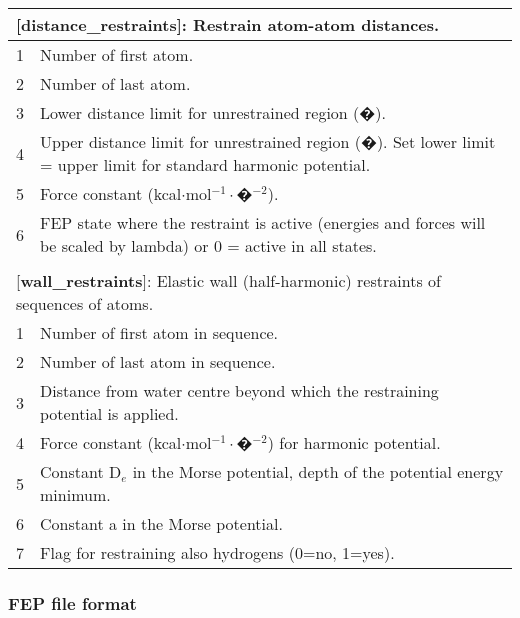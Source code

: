 \documentclass[a4paper,10pt]{article}
\begin{document}
\begin{longtable}{|p{78pt}|p{158pt}|p{158pt}|}
\multicolumn{3}{p{394pt}}{[\textbf{distance\_restraints}]: Restrain atom-atom distances.}\\
\hline 1 & \multicolumn{2}{p{320pt}|}{  Number of first atom.}\\
\hline 2 & \multicolumn{2}{p{320pt}|}{  Number of last atom.}\\
\hline 3 & \multicolumn{2}{p{320pt}|}{  Lower distance limit for unrestrained region (�).}\\
\hline 4 & \multicolumn{2}{p{320pt}|}{  Upper distance limit for unrestrained region (�). Set lower limit = upper limit for standard harmonic potential.}\\
\hline 5 & \multicolumn{2}{p{320pt}|}{  Force constant (kcal$\cdot$mol$^{-1}\cdot$�$^{-2}$).}\\
\hline 6 & \multicolumn{2}{p{320pt}|}{  FEP state where the restraint is active (energies and forces will be scaled by lambda) or 0 = active in all states.}\\
\hline
\multicolumn{3}{p{394pt}}{}\\

\multicolumn{3}{p{394pt}}{[\textbf{wall\_restraints}]: Elastic wall (half-harmonic) restraints of sequences of atoms.}\\
\hline 1 & \multicolumn{2}{p{320pt}|}{  Number of first atom in sequence.}\\
\hline 2 & \multicolumn{2}{p{320pt}|}{  Number of last atom in sequence.}\\
\hline 3 & \multicolumn{2}{p{320pt}|}{  Distance from water centre beyond which the restraining potential is applied.}\\
\hline 4 & \multicolumn{2}{p{320pt}|}{  Force constant (kcal$\cdot$mol$^{-1}\cdot$�$^{-2}$) for harmonic potential.}\\
\hline 5 & \multicolumn{2}{p{320pt}|}{  Constant D$_{e}$ in the Morse potential, depth of the potential energy minimum.}\\
\hline 6 & \multicolumn{2}{p{320pt}|}{  Constant a in the Morse potential.}\\
\hline 7 & \multicolumn{2}{p{320pt}|}{  Flag for restraining also hydrogens (0=no, 1=yes).}\\
\hline
\end{longtable}
\normalsize

\subsubsection{FEP file format}
\label{subsubsec:fepfileformat}
\end{document}
